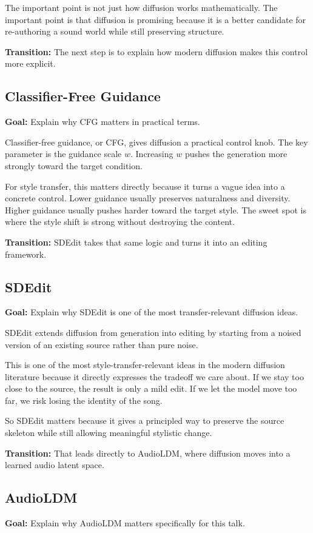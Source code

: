 \documentclass[11pt]{article}
\begin{document}
The important point is not just how diffusion works mathematically. The important point is that diffusion is promising because it is a better candidate for re-authoring a sound world while still preserving structure.

\textbf{Transition:} The next step is to explain how modern diffusion makes this control more explicit.

\subsection*{Classifier-Free Guidance}
\textbf{Goal:} Explain why CFG matters in practical terms.

Classifier-free guidance, or CFG, gives diffusion a practical control knob. The key parameter is the guidance scale \(w\). Increasing \(w\) pushes the generation more strongly toward the target condition.

For style transfer, this matters directly because it turns a vague idea into a concrete control. Lower guidance usually preserves naturalness and diversity. Higher guidance usually pushes harder toward the target style. The sweet spot is where the style shift is strong without destroying the content.

\textbf{Transition:} SDEdit takes that same logic and turns it into an editing framework.

\subsection*{SDEdit}
\textbf{Goal:} Explain why SDEdit is one of the most transfer-relevant diffusion ideas.

SDEdit extends diffusion from generation into editing by starting from a noised version of an existing source rather than pure noise.

This is one of the most style-transfer-relevant ideas in the modern diffusion literature because it directly expresses the tradeoff we care about. If we stay too close to the source, the result is only a mild edit. If we let the model move too far, we risk losing the identity of the song.

So SDEdit matters because it gives a principled way to preserve the source skeleton while still allowing meaningful stylistic change.

\textbf{Transition:} That leads directly to AudioLDM, where diffusion moves into a learned audio latent space.

\subsection*{AudioLDM}
\textbf{Goal:} Explain why AudioLDM matters specifically for this talk.
\end{document}
